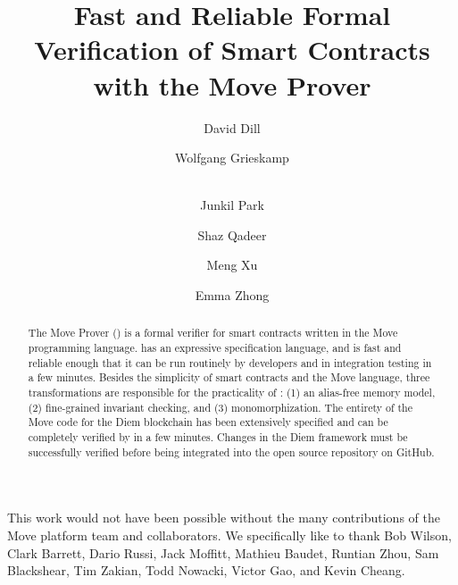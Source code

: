 \documentclass[runningheads]{llncs}
\begin{document}
\author{
  David Dill \and Wolfgang Grieskamp \and \\ Junkil
  Park \and Shaz Qadeer \and Meng Xu
  \and Emma Zhong
}


\title{Fast and Reliable Formal Verification of Smart Contracts with the Move Prover}

\maketitle
\begin{abstract}
  The Move Prover (\MVP) is a formal verifier for smart contracts
  written in the Move programming language. \MVP has an expressive
  specification language, and is fast and reliable enough that it can
  be run routinely by developers and in integration testing in a few
  minutes. Besides the simplicity of smart contracts and the Move
  language, three transformations are responsible for the practicality
  of \MVP: (1) an alias-free memory model, (2) fine-grained invariant
  checking, and (3) monomorphization.  The entirety of the Move code for
  the Diem blockchain has been extensively specified and can be
  completely verified by \MVP in a few minutes. Changes in the Diem
  framework must be successfully verified before being integrated into
  the open source repository on GitHub.
\end{abstract}









This work would not have been possible without the many contributions of the
Move platform team and collaborators.  We specifically like to thank Bob Wilson,
Clark Barrett, Dario Russi, Jack Moffitt, Mathieu Baudet, Runtian Zhou, Sam
Blackshear, Tim Zakian, Todd Nowacki, Victor Gao, and Kevin Cheang.

\newpage



\appendix
\newpage

\newpage

\end{document}
